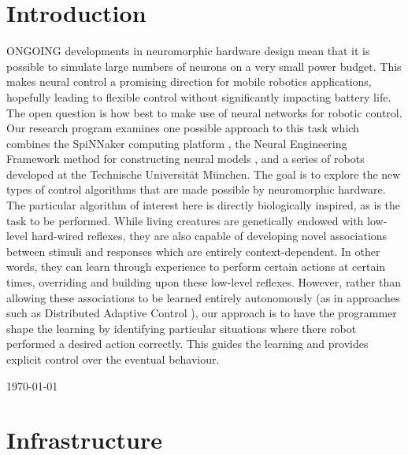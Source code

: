 \documentclass[conference]{IEEEtran}
\begin{document}
\IEEEpeerreviewmaketitle


\section{Introduction}

ONGOING developments in neuromorphic hardware design mean that it is possible to simulate large numbers of neurons on a very small power budget. This makes neural control a promising direction for mobile robotics applications, hopefully leading to flexible control without significantly impacting battery life. The open question is how best to make use of neural networks for robotic control. Our research program examines one possible approach to this task which combines the SpiNNaker computing platform \cite{furber2007neural, furber2014spinnaker}, the Neural Engineering Framework method for constructing neural models \cite{eliasmith2004neural}, and a series of robots developed at the Technische Universit{\"a}t M{\"u}nchen. The goal is to explore the new types of control algorithms that are made possible by neuromorphic hardware. The particular algorithm of interest here is directly biologically inspired, as is the task to be performed. While living creatures are genetically endowed with low-level hard-wired reflexes, they are also capable of developing novel associations between stimuli and responses which are entirely context-dependent. In other words, they can learn through experience to perform certain actions at certain times, overriding and building upon these low-level reflexes. However, rather than allowing these associations to be learned entirely autonomously (as in approaches such as Distributed Adaptive Control \cite{verschure2012distributed}), our approach is to have the programmer shape the learning by identifying particular situations where there robot performed a desired action correctly. This guides the learning and provides explicit control over the eventual behaviour. 

 
\hfill \today

\section{Infrastructure}
\end{document}
